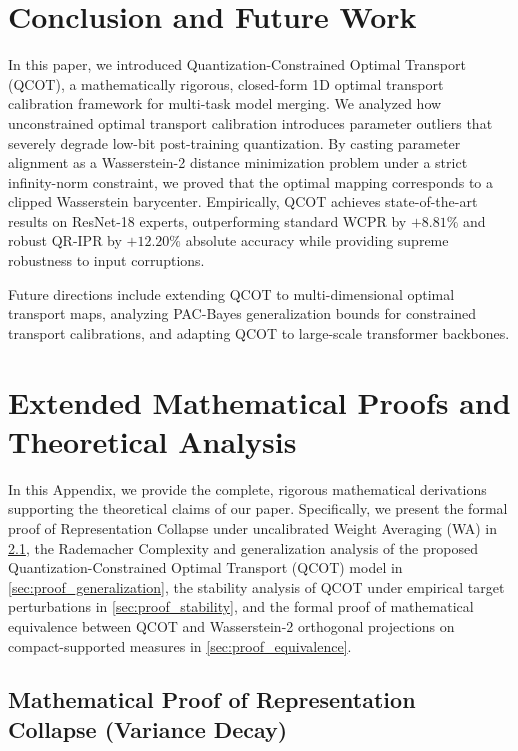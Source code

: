 \documentclass{article}
\theoremstyle{plain}
\theoremstyle{definition}
\theoremstyle{remark}
\begin{document}
\section{Conclusion and Future Work}
\label{sec:conclusion}
In this paper, we introduced Quantization-Constrained Optimal Transport (QCOT), a mathematically rigorous, closed-form 1D optimal transport calibration framework for multi-task model merging. We analyzed how unconstrained optimal transport calibration introduces parameter outliers that severely degrade low-bit post-training quantization. By casting parameter alignment as a Wasserstein-2 distance minimization problem under a strict infinity-norm constraint, we proved that the optimal mapping corresponds to a clipped Wasserstein barycenter. Empirically, QCOT achieves state-of-the-art results on ResNet-18 experts, outperforming standard WCPR by $+8.81\%$ and robust QR-IPR by $+12.20\%$ absolute accuracy while providing supreme robustness to input corruptions.

Future directions include extending QCOT to multi-dimensional optimal transport maps, analyzing PAC-Bayes generalization bounds for constrained transport calibrations, and adapting QCOT to large-scale transformer backbones.

\begingroup
\setlength{\bibsep}{0.1pt}
\fontsize{8.2pt}{9.2pt}\selectfont


\endgroup

\newpage
\appendix
\onecolumn

\section{Extended Mathematical Proofs and Theoretical Analysis}
\label{sec:appendix}

In this Appendix, we provide the complete, rigorous mathematical derivations supporting the theoretical claims of our paper. Specifically, we present the formal proof of Representation Collapse under uncalibrated Weight Averaging (WA) in \cref{sec:proof_collapse}, the Rademacher Complexity and generalization analysis of the proposed Quantization-Constrained Optimal Transport (QCOT) model in \cref{sec:proof_generalization}, the stability analysis of QCOT under empirical target perturbations in \cref{sec:proof_stability}, and the formal proof of mathematical equivalence between QCOT and Wasserstein-2 orthogonal projections on compact-supported measures in \cref{sec:proof_equivalence}.

\subsection{Mathematical Proof of Representation Collapse (Variance Decay)}
\label{sec:proof_collapse}
\end{document}
